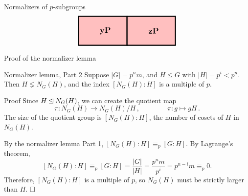 \documentclass[8pt, handout]{beamer}
\newcommand{\Pause}{}      %
\begin{document}
\begin{frame}{Normalizers of $p$-subgroups}
\[\begin{tikzpicture}[scale=.5]
\begin{scope}[shift={(12.5,0)}]
\begin{scope}[shift={(5,0)}]
      \end{scope}
      \begin{scope}[shift={(0,-3)}]
        \draw[color=boxRed,fill=boxRed] (0,0) rectangle (5,3);
        \draw[ultra thick] (0,0) rectangle (5,3);
        \node at (2.75,1.5) {\large\bf $\mathbf{yP}$};
      \end{scope}
      \begin{scope}[shift={(5,-3)}]
        \draw[color=boxRed,fill=boxRed] (0,0) rectangle (5,3);
        \draw[ultra thick] (0,0) rectangle (5,3);
        \node at (2.75,1.5) {\large\bf $\mathbf{zP}$};
      \end{scope}
    \end{scope}
  \end{tikzpicture}
  \]
  
\end{frame}


\begin{frame}{Proof of the normalizer lemma}

  \begin{block}{Normalizer lemma, Part 2} 
    Suppose $|G|=p^nm$, and $H\leq G$ with $|H|=p^i<p^n$. Then $H\lneq
    N_G(H)$, and the index $[N_G(H):H]$ is a multiple of $p$. 
  \end{block}

  \begin{exampleblock}{Proof} 
    Since $H\unlhd N_G(H)$, we can create the quotient map 
    \[
    \pi\colon N_G(H)\longrightarrow N_G(H)/H\,,\qquad\qquad \pi\colon
    g\longmapsto gH\,. \Pause
    \]
    The size of the quotient group is $[N_G(H)\colon H]$, the number of
    cosets of $H$ in $N_G(H)$.
    
    \pause\bigskip
    
    By the normalizer lemma Part 1, $[N_G(H)\colon H]\equiv_p[G\colon
      H]$. \Pause By Lagrange's theorem, %
    \[
    [N_G(H)\colon H]\equiv_p[G\colon
      H]=\frac{|G|}{|H|}\Pause=\frac{p^nm}{p^i}=p^{n-i}m\equiv_p 0.
    \]
    \pause Therefore, $[N_G(H)\colon H]$ is a multiple of $p$, so $N_G(H)$
    must be strictly larger than $H$. $\hfill\Box$
  \end{exampleblock}
  
\end{frame}

\end{document}
